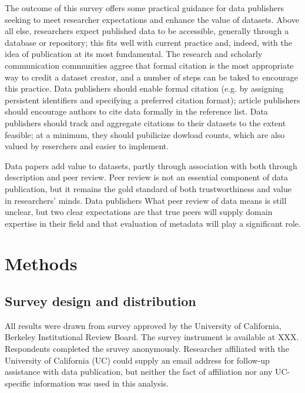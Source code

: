 \documentclass[10pt]{article}
\begin{document}
The outcome of this survey offers some practical guidance for data publishers seeking to meet researcher expectations and enhance the value of datasets.
Above all else, researchers expect published data to be accessible, generally through a database or repository; this fits well with current practice and, indeed, with the idea of publication at its most fundamental.
The research and scholarly communication communities aggree that formal citation is the most appropriate way to credit a dataset creator, and a number of steps can be taked to encourage this practice.
Data publishers should enable formal citation (e.g. by assigning persistent identifiers and specifying a preferred citation format); article publishers should encourage authors to cite data formally in the reference list.
Data publishers should track and aggregate citations to their datasets to the extent feasible; at a minimum, they should pubilicize dowload counts, which are also valued by reserchers and easier to implement.

Data papers add value to datasets, partly through association with both through description and peer review.
Peer review is not an essential component of data publication, but it remains the gold standard of both trustworthiness and value in researchers' minds.
Data publishers 
What peer review of data means is still unclear, but two clear expectations are that true peers will supply domain expertise in their field and that evaluation of metadata will play a significant role.


\section*{Methods}

\subsection*{Survey design and distribution}
All results were drawn from survey approved by the University of California, Berkeley Institutional Review Board. %
The survey instrument is available at XXX.
Respondents completed the sruvey anonymously.
Researcher affiliated with the University of California (UC) could supply an email address for follow-up assistance with data publication, but neither the fact of affiliation nor any UC-specific information was used in this analysis.
\end{document}

